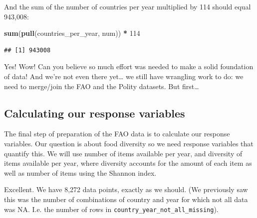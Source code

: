 \documentclass[]{book}
\newenvironment{Shaded}{\begin{snugshade}}{\end{snugshade}}
\newcommand{\DataTypeTok}[1]{\textcolor[rgb]{0.13,0.29,0.53}{#1}}
\newcommand{\DecValTok}[1]{\textcolor[rgb]{0.00,0.00,0.81}{#1}}
\newcommand{\KeywordTok}[1]{\textcolor[rgb]{0.13,0.29,0.53}{\textbf{#1}}}
\newcommand{\NormalTok}[1]{#1}
\newcommand{\OperatorTok}[1]{\textcolor[rgb]{0.81,0.36,0.00}{\textbf{#1}}}
\newcommand{\StringTok}[1]{\textcolor[rgb]{0.31,0.60,0.02}{#1}}
\begin{document}
And the sum of the number of countries per year multiplied by 114 should equal 943,008:

\begin{Shaded}
\begin{Highlighting}[]
\KeywordTok{sum}\NormalTok{(}\KeywordTok{pull}\NormalTok{(countries_per_year, num)) }\OperatorTok{*}\StringTok{ }\DecValTok{114}
\end{Highlighting}
\end{Shaded}

\begin{verbatim}
## [1] 943008
\end{verbatim}

Yes! Wow! Can you believe so much effort was needed to make a solid foundation of data! And we're not even there yet\ldots{} we still have wrangling work to do: we need to merge/join the FAO and the Polity datasets. But first\ldots{}

\hypertarget{calculating-our-response-variables}{%
\subsection{Calculating our response variables}\label{calculating-our-response-variables}}

The final step of preparation of the FAO data is to calculate our response variables. Our question is about food diversity so we need response variables that quantify this. We will use number of items available per year, and diversity of items available per year, where diversity accounts for the amount of each item as well as number of items using the Shannon index.

\begin{Shaded}
\end{Shaded}

Excellent. We have 8,272 data points, exactly as we should. (We previously saw this was the number of combinations of country and year for which not all data was NA. I.e. the number of rows in \texttt{country\_year\_not\_all\_missing}).
\end{document}
